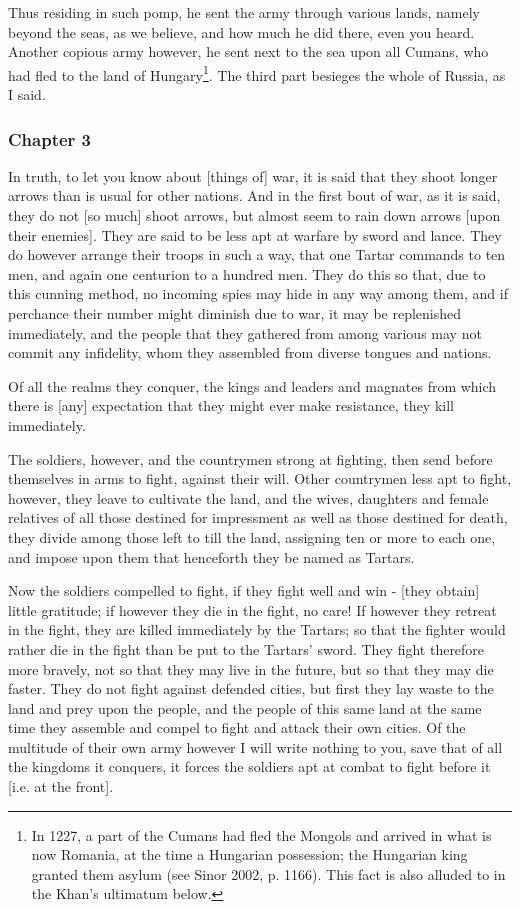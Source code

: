 Thus residing in such pomp, he sent the army through various lands, namely beyond the seas, as we believe, and how much he did there, even you heard. Another copious army however, he sent next to the sea upon all Cumans, who had fled to the land of Hungary\footnote{In 1227, a part of the Cumans had fled the Mongols and arrived in what is now Romania, at the time a Hungarian possession; the Hungarian king granted them asylum (see Sinor 2002, p. 1166). This fact is also alluded to in the Khan's ultimatum below.}. The third part besieges the whole of Russia, as I said.


\subsubsection{Chapter 3}

In truth, to let you know about [things of] war, it is said that they shoot longer arrows than is usual for other nations. And in the first bout of war, as it is said, they do not [so much] shoot arrows, but almost seem to rain down arrows [upon their enemies]. They are said to be less apt at warfare by sword and lance. They do however arrange their troops in such a way, that one Tartar commands to ten men, and again one centurion to a hundred men. They do this so that, due to this cunning method, no incoming spies may hide in any way among them, and if perchance their number might diminish due to war, it may be replenished immediately, and the people that they gathered from among various may not commit any infidelity, whom they assembled from diverse tongues and nations.

Of all the realms they conquer, the kings and leaders and magnates from which there is [any] expectation that they might ever make resistance, they kill immediately.

The soldiers, however, and the countrymen strong at fighting, then send before themselves in arms to fight, against their will. Other countrymen less apt to fight, however, they leave to cultivate the land, and the wives, daughters and female relatives of all those destined for impressment as well as those destined for death, they divide among those left to till the land, assigning ten or more to each one, and impose upon them that henceforth they be named as Tartars. 

Now the soldiers compelled to fight, if they fight well and win - [they obtain] little gratitude; if however they die in the fight, no care! If however they retreat in the fight, they are killed immediately by the Tartars; so that the fighter would rather die in the fight than be put to the Tartars' sword. They fight therefore more bravely, not so that they may live in the future, but so that they may die faster. They do not fight against defended cities, but first they lay waste to the land and prey upon the people, and the people of this same land at the same time they assemble and compel to fight and attack their own cities. Of the multitude of their own army however I will write nothing to you, save that of all the kingdoms it conquers, it forces the soldiers apt at combat to fight before it [i.e. at the front].



